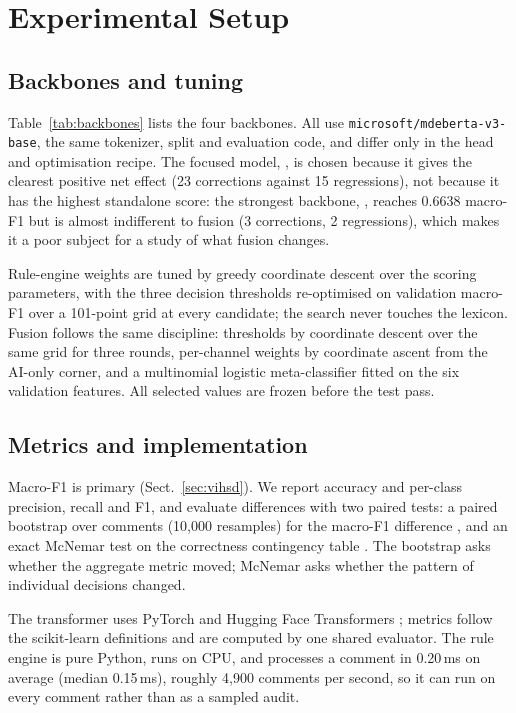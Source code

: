 \section{Experimental Setup}
\label{sec:setup}

\subsection{Backbones and tuning}
\label{sec:backbones}

Table~\ref{tab:backbones} lists the four backbones. All use
\texttt{microsoft/mdeberta-v3-base}, the same tokenizer, split and evaluation code,
and differ only in the head and optimisation recipe. The focused model,
, is chosen because it gives the clearest positive net
effect (23 corrections against 15 regressions), not because it has the highest
standalone score: the strongest backbone, , reaches
0.6638 macro-F1 but is almost indifferent to fusion (3 corrections, 2 regressions),
which makes it a poor subject for a study of what fusion changes.



Rule-engine weights are tuned by greedy coordinate descent over the scoring
parameters, with the three decision thresholds re-optimised on validation macro-F1
over a 101-point grid at every candidate; the search never touches the lexicon.
Fusion follows the same discipline: thresholds by coordinate descent over the same
grid for three rounds, per-channel weights by coordinate ascent from the AI-only
corner, and a multinomial logistic meta-classifier fitted on the six validation
features. All selected values are frozen before the test pass.

\subsection{Metrics and implementation}
\label{sec:metrics}

Macro-F1 is primary (Sect.~\ref{sec:vihsd}). We report accuracy and per-class
precision, recall and F1, and evaluate differences with two
paired tests: a paired bootstrap over comments (10{,}000 resamples) for the
macro-F1 difference \cite{efron1993bootstrap}, and an exact McNemar test on the
correctness contingency table \cite{mcnemar1947note}. The bootstrap asks whether
the aggregate metric moved; McNemar asks whether the pattern of individual
decisions changed.

The transformer uses PyTorch and Hugging Face Transformers
\cite{wolf2020transformers}; metrics follow the scikit-learn definitions and are
computed by one shared evaluator. The rule engine is pure
Python, runs on CPU, and processes a comment in 0.20\,ms on average (median 0.15\,ms),
roughly 4{,}900 comments per second, so it can run on every comment rather than as
a sampled audit.

